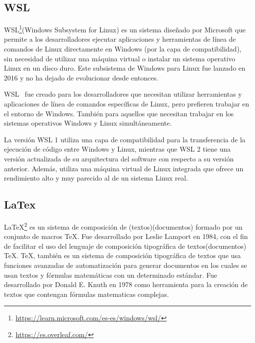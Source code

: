 \documentclass[a4paper, 12pt]{book}
\begin{document}
\subsection{WSL} %
\label{sec:wsl} %

WSL\footnote{\url{https://learn.microsoft.com/es-es/windows/wsl/}}(Windows Subsystem for Linux) es un sistema diseñado por Microsoft que permite a los desarrolladores ejecutar aplicaciones y herramientas de línea de comandos de Linux directamente en Windows (por la capa de compatibilidad), sin necesidad de utilizar una máquina virtual o instalar un sistema operativo Linux en un disco duro. 
Este subsistema de Windows para Linux fue lanzado en 2016 y no ha dejado de evolucionar desde entonces. 


WSL~\cite{medriforensic} fue creado para los desarrolladores que necesitan utilizar herramientas y aplicaciones de línea de comandos específicas de Linux, pero prefieren trabajar en el entorno de Windows. 
También para aquellos que necesitan trabajar en los sistemas operativos Windows y Linux simultáneamente.


La versión WSL 1 utiliza una capa de compatibilidad para la transferencia de la ejecución de código entre Windows y Linux,
mientras que WSL 2 tiene una versión actualizada de su arquitectura del software con respecto a su versión anterior. 
Además, utiliza una máquina virtual de Linux integrada que ofrece un rendimiento alto y muy parecido al de un sistema Linux real.


\subsection{LaTex} %
\label{sec:latex} %

LaTeX\footnote{\url{https://es.overleaf.com/}} es un sistema de composición de (textos)(documentos) formado por un conjunto de macros TeX. 
Fue desarrollado por Leslie Lamport en 1984, con el fin de facilitar el uso del lenguaje de composición tipográfica de textos(documentos) TeX.
TeX, también es un sistema de composición tipográfica de textos que usa funciones avanzadas de automatización para generar documentos en los cuales se usan textos y fórmulas matemáticas con un determinado estándar.
Fue desarrollado por Donald E. Knuth en 1978 como herramienta para la creación de textos que contengan fórmulas matematicas complejas.
\end{document}
